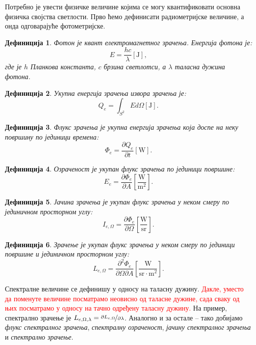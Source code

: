 \documentclass[12pt, a4paper, twoside]{book}
\numberwithin{equation}{chapter}
\numberwithin{theorem}{section}
\newtheorem{definition}{Дефиниција}
\numberwithin{definition}{section}
\numberwithin{definitionChapter}{chapter}
\begin{document}
Потребно је увести физичке величине којима се могу квантификовати основна физичка својства
светлости. Прво ћемо дефинисати радиометријске величине, а онда одговарајуће фотометријске.

\begin{definition}
	Фотон је квант електромагнетног зрачења. Енергија фотона је:
	$$E=\frac{hc}{\lambda} \left[\mathrm{J}\right],$$ где је $h$ Планкова константа, $c$ брзина светлотси, а $\lambda$ 
	таласна дужина фотона.
\end{definition}

\begin{definition}
	Укупна енергија зрачења извора зрачења је: $$Q_e = \int_{S^2} E d\Omega \left[\mathrm{J}\right].$$
\end{definition}

\begin{definition}
	Флукс зрачења је укупна енергија зрачења која доспе на неку површину по јединици времена:
	$$\Phi_e = \frac{\partial Q_e}{\partial t} \left[\mathrm{W}\right].$$
\end{definition}

\begin{definition}
	Озраченост је укупан флукс зрачења по јединици површине:
	$$E_e = \frac{\partial \Phi_e}{\partial A} \left[\mathrm{\frac{W}{m^2}}\right].$$
\end{definition}

\begin{definition}
	Јачина зрачења је укупан флукс зрачења у неком смеру по јединичном просторном углу:
	$$I_{e, \Omega} = \frac{\partial \Phi_e}{\partial \Omega} \left[\mathrm{\frac{W}{sr}}\right].$$
\end{definition}

\begin{definition}
	Зрачење је укупан флукс зрачења у неком смеру по јединици површине и јединичном просторном углу:
	$$L_{e, \Omega} = \frac{\partial^2 \Phi_e}{\partial \Omega \partial A} \left[\mathrm{\frac{W}{sr \cdot m^2}}\right].$$
\end{definition}

Спектралне величине се дефинишу у односу на таласну дужину. \textcolor{red}{Дакле, уместо да поменуте величине посматрамо
неовисно од таласне дужине, сада сваку од њих посматрамо у односу на тачно одређену таласну дужину.}
На пример, спектрално зрачење је $L_{e, \Omega, \lambda} = \nicefrac{\partial L_{e, \Omega}}{\partial \lambda}$. Аналогно
и за остале -- тако добијамо \textit{флукс спектралног зрачења}, \textit{спектралну озраченост},
\textit{јачину спектралног зрачења} и \textit{спектрално зрачење}.
\end{document}
